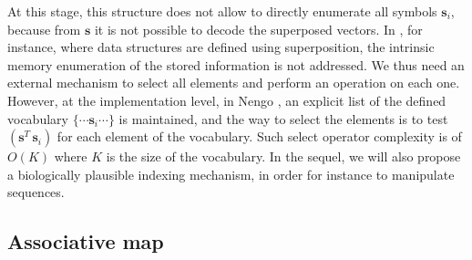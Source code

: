 \documentclass[sn-mathphys]{sn-jnl}
\begin{document}
At this stage, this structure does not allow to directly enumerate all symbols $\mathbf{s}_i$, because from $\mathbf{s}$ it is not possible to decode the superposed vectors. In \cite{crawford_biologically_2016}, for instance, where data structures are defined using superposition, the intrinsic memory enumeration of the stored information is not addressed. We thus need an external mechanism to select all elements and perform an operation on each one. However, at the implementation level, in Nengo \cite{eliasmith_how_2013}, an explicit list of the defined vocabulary $\{\cdots \mathbf{s}_i \cdots\}$ is maintained, and the way to select the elements is to test $(\mathbf{s}^T \, \mathbf{s}_i)$ for each element of the vocabulary. Such select operator complexity is of $O(K)$ where $K$ is the size of the vocabulary. In the sequel, we will also propose a biologically plausible indexing mechanism, in order for instance to manipulate sequences.

\subsection{Associative map}
\end{document}
